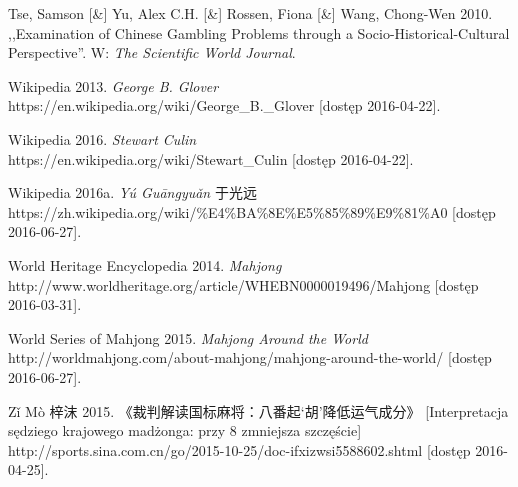 Tse, Samson [\&] Yu, Alex C.H. [\&] Rossen, Fiona [\&] Wang, Chong-Wen
2010.
,,Examination of Chinese Gambling Problems through a Socio-Historical-Cultural Perspective''. W: \textit{The
Scientific World Journal}.

Wikipedia 2013. \textit{George B. Glover}
\\https://en.wikipedia.org/wiki/George\_B.\_Glover [dostęp 2016-04-22].

Wikipedia 2016. \textit{Stewart Culin}
\\https://en.wikipedia.org/wiki/Stewart\_Culin [dostęp 2016-04-22].

Wikipedia 2016a. \textit{Yú Guāngyuǎn} 于光远
\\https://zh.wikipedia.org/wiki/\%E4\%BA\%8E\%E5\%85\%89\%E9\%81\%A0 [dostęp
2016-06-27].


World Heritage Encyclopedia 2014. \textit{Mahjong}
\\http://www.worldheritage.org/article/WHEBN0000019496/Mahjong [dostęp
2016-03-31].

World Series of Mahjong 2015. \textit{Mahjong Around the World}
\\http://worldmahjong.com/about-mahjong/mahjong-around-the-world/ [dostęp
2016-06-27].

Zǐ Mò 梓沫 2015. 《裁判解读国标麻将：八番起‘胡’降低运气成分》
[Interpretacja sędziego krajowego madżonga:
 przy 8  zmniejsza szczęście] %
\\http://sports.sina.com.cn/go/2015-10-25/doc-ifxizwsi5588602.shtml [dostęp 2016-04-25].



